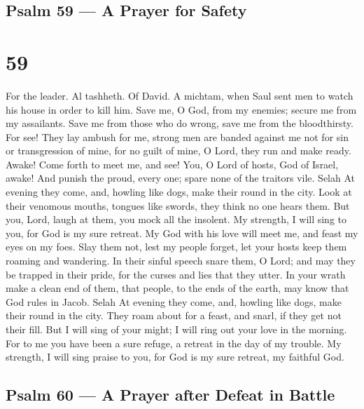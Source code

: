 \hypertarget{psalm-59-a-prayer-for-safety}{%
\subsection{Psalm 59 --- A Prayer for
Safety}\label{psalm-59-a-prayer-for-safety}}

\hypertarget{section-58}{%
\section{59}\label{section-58}}

For the leader. Al tashheth. Of David. A michtam, when Saul sent men to
watch his house in order to kill him.  Save me, O God, from
my enemies; secure me from my assailants.  Save me from
those who do wrong, save me from the bloodthirsty.  For see!
They lay ambush for me, strong men are banded against me not for sin or
transgression of mine, for no guilt of mine, O Lord,  they
run and make ready. Awake! Come forth to meet me, and see! 
You, O Lord of hosts, God of Israel, awake! And punish the proud, every
one; spare none of the traitors vile. Selah  At evening they
come, and, howling like dogs, make their round in the city. 
Look at their venomous mouths, tongues like swords, they think no one
hears them.  But you, Lord, laugh at them, you mock all the
insolent.  My strength, I will sing to you, for God is my
sure retreat.  My God with his love will meet me, and feast
my eyes on my foes.  Slay them not, lest my people forget,
let your hosts keep them roaming and wandering.  In their
sinful speech snare them, O Lord; and may they be trapped in their
pride, for the curses and lies that they utter.  In your
wrath make a clean end of them, that people, to the ends of the earth,
may know that God rules in Jacob. Selah  At evening they
come, and, howling like dogs, make their round in the city.
 They roam about for a feast, and snarl, if they get not
their fill.  But I will sing of your might; I will ring out
your love in the morning. For to me you have been a sure refuge, a
retreat in the day of my trouble.  My strength, I will sing
praise to you, for God is my sure retreat, my faithful God.

\hypertarget{psalm-60-a-prayer-after-defeat-in-battle}{%
\subsection{Psalm 60 --- A Prayer after Defeat in
Battle}\label{psalm-60-a-prayer-after-defeat-in-battle}}

